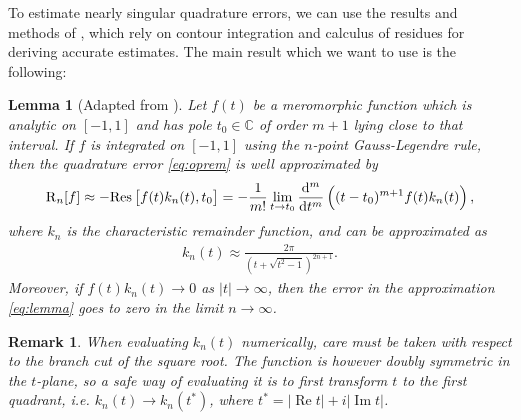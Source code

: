 \documentclass[hidelinks]{siamart1116}
\newtheorem{lemma}{Lemma}
\newtheorem{remark}{Remark}
\begin{document}
To estimate nearly singular quadrature errors, we can use the results and methods of \cite{AfKlinteberg2016quad}, which rely on contour integration and calculus of residues for deriving accurate estimates. The main result which we want to use is the following:
\begin{lemma}[Adapted from \cite{AfKlinteberg2016quad}]
  Let $f(t)$ be a meromorphic function which is analytic on $[-1, 1]$
  and has pole $t_0 \in \mathbb{C}$ of order $m+1$ lying close to that
  interval. If $f$ is integrated on $[-1,1]$ using the $n$-point
  Gauss-Legendre rule, then the quadrature error \eqref{eq:oprem} is
  well approximated by
  \begin{align}
    {\operatorname{R}_{n}}[f] \approx -{\operatorname{Res}}\left[ f(t) k_n(t), t_0 \right] =     -\frac{1}{m!} \lim_{t \to t_0} \dod[m]{}{t} \left( (t-t_0)^{m+1}       f(t) k_n(t) \right),
    \label{eq:lemma}
  \end{align}
  where $k_n$ is the characteristic remainder function, and can be   approximated as
  \begin{align}
    k_n(t) \approx \frac{2\pi}{(t+\sqrt{t^2-1})^{2n+1}} .
    \label{eq:kn}
  \end{align}
  Moreover, if $f(t)k_n(t) \to 0$ as $|t|\to\infty$, then the error in
  the approximation \eqref{eq:lemma} goes to zero in the limit
  $n\to\infty$.
  \label{lem:quad_err}
\end{lemma}
\begin{remark}
  When evaluating $k_n(t)$ numerically, care must be taken with
  respect to the branch cut of the square root. The function is
  however doubly symmetric in the $t$-plane, so a safe way of
  evaluating it is to first transform $t$ to the first quadrant,
  i.e. $k_n(t) \to k_n(t^*)$, where $t^* = |{\operatorname{Re}} t| + i|{\operatorname{Im}} t|$.
\end{remark}
\end{document}
